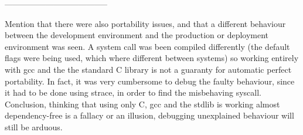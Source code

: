--------------------------------------

Mention that there were also portability issues, and that a different behaviour between the development environment and the production or deployment environment was seen. A system call was been compiled differently (the default flags were being used, which where different between systems) so working entirely with gcc and the the standard C library is not a guaranty for automatic perfect portability. In fact, it was very cumbersome to debug the faulty behaviour, since it had to be done using strace, in order to find the misbehaving syscall. Conclusion, thinking that using only C, gcc and the stdlib is working almost dependency-free is a fallacy or an illusion, debugging unexplained behaviour will still be arduous.
